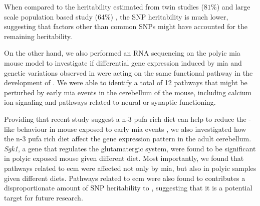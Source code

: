 \documentclass[12pt]{scrbook}
\newcommand*{\glng}{\glsentrylong}
\begin{document}
	When compared to the heritability estimated from twin studies ($81\%$) \citep{Sullivan2003} and large scale population based study (64\%) \citep{Lichtenstein2009}, the \gls{SNP} heritability is much lower, suggesting that factors other than common \glspl{SNP} might have accounted for the remaining heritability.
	
	On the other hand, we also performed an RNA sequencing on the \gls{polyic} \gls{mia} mouse model to investigate if differential gene expression induced by \gls{mia} and genetic variations observed in \glng{scz} were acting on the same functional pathway in the development of \glng{scz}.
	We were able to identify a total of 12 pathways that might be perturbed by early \gls{mia} events in the cerebellum of the mouse, including calcium ion signaling and pathways related to neural or synaptic functioning.
	
	Providing that recent study suggest a n-3 \gls{pufa} rich diet can help to reduce the \glng{scz}-like behaviour in mouse exposed to early \gls{mia} events \citep{Li2015}, we also investigated how the n-3 \gls{pufa} rich diet affect the gene expression pattern in the adult cerebellum.
	\textit{Sgk1}, a gene that regulates the glutamatergic system, were found to be significant in \gls{polyic} exposed mouse given different diet. 
	Most importantly, we found that pathways related to \gls{ecm} were affected not only by \gls{mia}, but also in \gls{polyic} samples given different diets. 
	Pathways related to \gls{ecm} were also found to contributes a disproportionate amount of \gls{SNP} heritability to \glng{scz}, suggesting that it is a potential target for future research.
	
\end{document}
